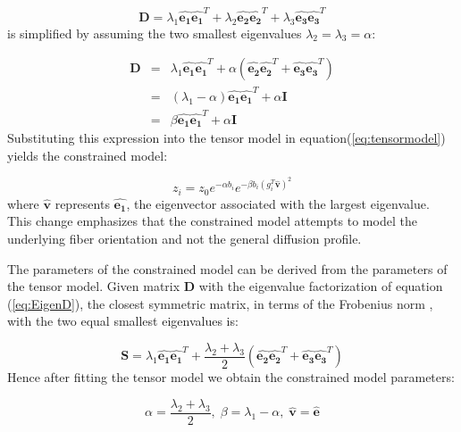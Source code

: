 \begin{equation} \label{eq:EigenD}
\mathbf{D} = \lambda_1 \mathbf{\hat{e_1}}\mathbf{\hat{e_1}}^T + 
\lambda_2 \mathbf{\hat{e_2}}\mathbf{\hat{e_2}}^T +
\lambda_3 \mathbf{\hat{e_3}}\mathbf{\hat{e_3}}^T
\end{equation}
%
%
is simplified by assuming the two smallest eigenvalues $\lambda_2 = \lambda_3 = \alpha $:

\begin{eqnarray} \label{eq:ConstrainedEigenD}
\mathbf{D} & = & \lambda_1 \mathbf{\hat{e_1}}\mathbf{\hat{e_1}}^T +
\alpha (\mathbf{\hat{e_2}}\mathbf{\hat{e_2}}^T + \mathbf{\hat{e_3}}\mathbf{\hat{e_3}}^T) \nonumber\\
& = & (\lambda_1 - \alpha) \mathbf{\hat{e_1}}\mathbf{\hat{e_1}}^T + \alpha\mathbf{I} \nonumber\\
& = & \beta\mathbf{\hat{e_1}}\mathbf{\hat{e_1}}^T + \alpha\mathbf{I}
\end{eqnarray}
%
%
Substituting this expression into the tensor model in equation(\ref{eq:tensormodel}) yields the constrained model:

\begin{equation} \label{eq:ConstrainedModel}
z_{i} = z_0 e^{-\alpha b_i} e^{-\beta b_i (g_i^T\mathbf{\hat{v}} ) ^2}
\end{equation}
%
%
where $\mathbf{\hat{v}}$ represents $\mathbf{\hat{e_1}}$, the eigenvector associated with the largest eigenvalue.  This change emphasizes that the constrained model attempts to model the underlying fiber orientation and not the general diffusion profile.

The parameters of the constrained model can be derived from the parameters of the tensor model.  Given matrix $\mathbf{D}$ with the eigenvalue factorization of equation (\ref{eq:EigenD}), the closest symmetric matrix, in terms of the Frobenius norm \cite{frimanTMI06}, with the two equal smallest eigenvalues is:

\begin{equation} \label{eq:derivedmatrix}
\mathbf{S} = \lambda_1 \mathbf{\hat{e_1}}\mathbf{\hat{e_1}}^T + 
\frac{\lambda_2 + \lambda_3}{2} (\mathbf{\hat{e_2}}\mathbf{\hat{e_2}}^T +
\mathbf{\hat{e_3}}\mathbf{\hat{e_3}}^T)
\end{equation}
%
%
Hence after fitting the tensor model we obtain the constrained model parameters:

\begin{equation} \label{eq:constrainedparams}
\alpha = \frac{\lambda_2 + \lambda_3}{2},\;
\beta = \lambda_1 - \alpha,\;
\mathbf{\hat{v}} = \mathbf{\hat{e}}
\end{equation}

